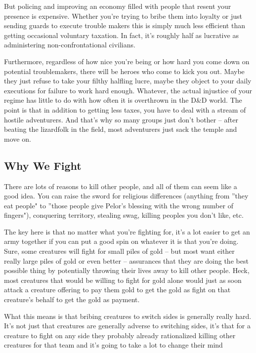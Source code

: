 But policing and improving an economy filled with people that resent your presence is expensive. Whether you're trying to bribe them into loyalty or just sending guards to execute trouble makers this is simply much less efficient than getting occasional voluntary taxation. In fact, it's roughly half as lucrative as administering non-confrontational civilians.

Furthermore, regardless of how nice you're being or how hard you come down on potential troublemakers, there will be heroes who come to kick you out. Maybe they just refuse to take your filthy halfling lucre, maybe they object to your daily executions for failure to work hard enough. Whatever, the actual injustice of your regime has little to do with how often it is overthrown in the D\&D world. The point is that in addition to getting less taxes, you have to deal with a stream of hostile adventurers. And that's why so many groups just don't bother -- after beating the lizardfolk in the field, most adventurers just sack the temple and move on.

\subsection{Why We Fight}
\vspace*{-8pt}

There are lots of reasons to kill other people, and all of them can seem like a good idea. You can raise the sword for religious differences (anything from ''they eat people" to ''those people give Pelor's blessing with the wrong number of fingers"), conquering territory, stealing swag, killing peoples you don't like, etc.

The key here is that no matter what you're fighting for, it's a lot easier to get an army together if you can put a good spin on whatever it is that you're doing. Sure, some creatures will fight for small piles of gold -- but most want either really large piles of gold or even better -- assurances that they are doing the best possible thing by potentially throwing their lives away to kill other people. Heck, most creatures that would be willing to fight for gold alone would just as soon attack a creature offering to pay them gold to get the gold as fight on that creature's behalf to get the gold as payment.

What this means is that bribing creatures to switch sides is generally really hard. It's not just that creatures are generally adverse to switching sides, it's that for a creature to fight on any side they probably already rationalized killing other creatures for that team and it's going to take a lot to change their mind
